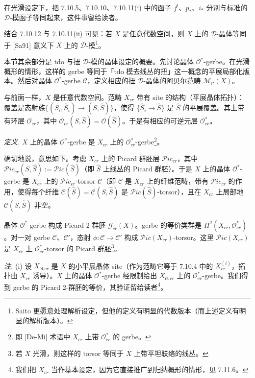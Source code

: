  在光滑设定下，把 7.10.5、7.10.10、7.10.11(i) 中的函子 $f^{!}$、$p_{*}$、$i_{*}$ 分别与标准的 $\mathcal{D}$-模函子等同起来，这件事留给读者。

结合 7.10.12 与 7.10.11(ii) 可见：若 $X$ 是任意代数空间，则 $X$ 上的 $\mathcal{D}$-晶体等同于 [Sa91] 意义下 $X$ 上的 $\mathcal{D}$-模\footnote{Saito 更愿意处理解析设定，但他的定义有明显的代数版本（而上述定义有明显的解析版本）。}。

 本节其余部分是 tdo 与扭 $\mathcal{D}$-模的晶体设定的概要。先讨论晶体 $\mathcal{O}^{*}$-gerbe。在光滑概形的情形，这样的 gerbe 等同于「tdo 模去线丛的扭」这一概念的平展局部化版本。然后对晶体 $\mathcal{O}^{*}$-gerbe $\mathcal{C}$，定义相应的扭 $\mathcal{D}$-晶体的阿贝尔范畴 $\mathcal{M}_{\mathcal{C}}(X)$。

 与前面一样，$X$ 是任意代数空间。范畴 $X_{cr}$ 带有 site 的结构（平展晶体拓扑）：覆盖是态射族$\{(S_{i},\hat S_{i})\to(S,\hat S)\}$，使得 $\{\hat S_{i}\to\hat S\}$ 是 $\hat S$ 的平展覆盖。其上带有环层 $\mathcal{O}_{cr}$，其中 $\mathcal{O}_{cr}(S,\hat S)=\mathcal{O}(\hat S)$。于是有相应的可逆元层 $\mathcal{O}^{*}_{cr}$。

 \emph{定义.} $X$ 上的晶体 $\mathcal{O}^{*}$-gerbe 是 $X_{cr}$ 上的 $\mathcal{O}^{*}_{cr}$-gerbe\footnote{即 [De-Mi] 术语中 $X_{cr}$ 上带 $\mathcal{O}^{*}_{cr}$ 的 gerbe。}。

确切地说，意思如下。考虑 $X_{cr}$ 上的 Picard 群胚层 $\mathcal{P}ic_{cr}$，其中 $\mathcal{P}ic_{cr}(S,\hat S):=\mathcal{P}ic(\hat S)$（即 $\hat S$ 上线丛的 Picard 群胚）。于是 $X$ 上的晶体 $\mathcal{O}^{*}$-gerbe 是 $X_{cr}$ 上的 $\mathcal{P}ic_{cr}$-torsor $\mathcal{C}$（即 $\mathcal{C}$ 是 $X_{cr}$ 上的纤维范畴，带有 $\mathcal{P}ic_{cr}$ 的作用，使得每个纤维 $\mathcal{C}(\hat S)=\mathcal{C}(S,\hat S)$ 是 $\mathcal{P}ic(\hat S)$-torsor），且在 $X_{cr}$ 上局部地 $\mathcal{C}(S,\hat S)$ 非空。

晶体 $\mathcal{O}^{*}$-gerbe 构成 Picard 2-群胚 $\mathcal{G}_{cr}(X)$。gerbe 的等价类群是 $H^{2}(X_{cr},\mathcal{O}^{*}_{cr})$。对一对 gerbe $\mathcal{C}$、$\mathcal{C}'$，态射 $\phi:\mathcal{C}\to\mathcal{C}'$ 构成 $\mathcal{P}ic(X_{cr})$-torsor。这里 $\mathcal{P}ic(X_{cr})$ 是 $X_{cr}$ 上 $\mathcal{O}^{*}_{cr}$-torsor 的 Picard 群胚\footnote{若 $X$ 光滑，则这样的 torsor 等同于 $X$ 上带平坦联络的线丛。}。

 \emph{注.} (i) 设 $X_{\text{ét}\,cr}$ 是 $X$ 的小平展晶体 site（作为范畴它等于 7.10.4 中的 $X^{(i)}_{cr}$，拓扑由 $X_{cr}$ 诱导）。$X$ 上的晶体 $\mathcal{O}^{*}$-gerbe 经限制给出 $X_{\text{ét}\,cr}$ 上的 $\mathcal{O}^{*}_{cr}$-gerbe。我们得到 gerbe 的 Picard 2-群胚的等价，其验证留给读者\footnote{我们把 $X_{cr}$ 当作基本设定，因为它直接推广到归纳概形的情形，见 7.11.6。}。

